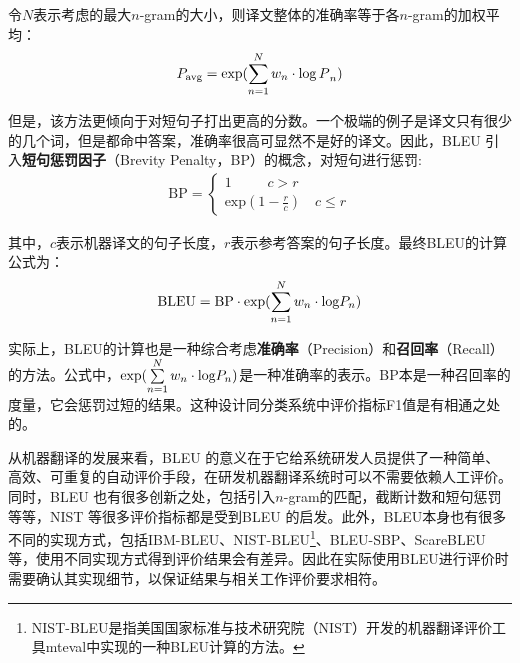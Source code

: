 \parinterval 令$N$表示考虑的最大$n$-gram的大小，则译文整体的准确率等于各$n$-gram的加权平均：
\begin{eqnarray}
{{P}_{{\textrm{avg}}}} = \exp (\sum\limits_{n = 1}^N {{w_n} \cdot {{{\mathop{\log{P}}\nolimits} }_n}} )
\label{eq:4-5}
\end{eqnarray}

\parinterval 但是，该方法更倾向于对短句子打出更高的分数。一个极端的例子是译文只有很少的几个词，但是都命中答案，准确率很高可显然不是好的译文。因此，BLEU 引入{\small\sffamily\bfseries{短句惩罚因子}}（Brevity Penalty，BP）的概念，对短句进行惩罚:
\begin{eqnarray}
\textrm {BP} = \left\{ \begin{array}{l}
1\quad \quad \;\;c > r\\
{\textrm{exp}}(1 - \frac{r}{c})\quad c \le r
\end{array} \right.
\label{eq:4-6}
\end{eqnarray}

\noindent 其中，$c$表示机器译文的句子长度，$r$表示参考答案的句子长度。最终BLEU的计算公式为：
\begin{eqnarray}
\textrm {BLEU} = \textrm {BP} \cdot \exp(\sum\limits_{n = 1}^N {{w_n} \cdot {{{\mathop{\textrm {log}}\nolimits} }{P}_n}} )
\label{eq:4-7}
\end{eqnarray}

\parinterval 实际上，BLEU的计算也是一种综合考虑{\small\sffamily\bfseries{准确率}}（Precision）和{\small\sffamily\bfseries{召回率}}（Recall）的方法。公式中，$\exp(\sum\limits_{n = 1}^N {{w_n} \cdot {{{\mathop{\textrm {log}}\nolimits} }{P}_n}} )$是一种准确率的表示。BP本是一种召回率的度量，它会惩罚过短的结果。这种设计同分类系统中评价指标F1值是有相通之处的。

\parinterval 从机器翻译的发展来看，BLEU 的意义在于它给系统研发人员提供了一种简单、高效、可重复的自动评价手段，在研发机器翻译系统时可以不需要依赖人工评价。同时，BLEU 也有很多创新之处，包括引入$n$-gram的匹配，截断计数和短句惩罚等等，NIST 等很多评价指标都是受到BLEU 的启发。此外，BLEU本身也有很多不同的实现方式，包括IBM-BLEU、NIST-BLEU\footnote{NIST-BLEU是指美国国家标准与技术研究院（NIST）开发的机器翻译评价工具mteval中实现的一种BLEU计算的方法。}、BLEU-SBP、ScareBLEU等，使用不同实现方式得到评价结果会有差异。因此在实际使用BLEU进行评价时需要确认其实现细节，以保证结果与相关工作评价要求相符。

